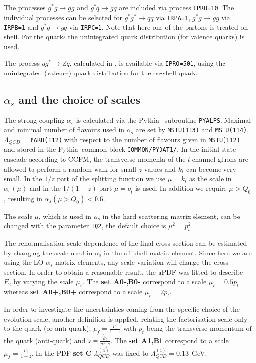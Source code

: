\documentclass[11pt]{article} \usepackage{mystyle-new}
\newcommand{\pt}{p_{t}}
\newcommand{\PYTHIAMC}{Pythia61}
\def\PYTHIA{{\sc Pythia}}
\begin{document}
 The processes $g^*g \to g g$ and $g^*q \to gq$ \cite{deak} are included via process 
\verb+IPRO=10+. The individual processes can be selected for $g^*g^* \to q\bar{q}$  via
\verb+IRPA=1+, $g^*g \to gg$  via \verb+IRPB=1+ and $g^* q \to gq$  via \verb+IRPC=1+. Note that here one of the partons is treated on-shell. For the quarks the unintegrated quark distribution (for valence quarks) is used.

The process $qg^* \to Z q$, calculated in \cite{Marzani:2008uh,Baranov:2008hj}, is available via \verb"IPRO=501", using the unintegrated (valence) quark distribution for the on-shell quark.

\subsection{$\alpha_s$ and the choice of scales}
The strong coupling $\alpha_s$ is calculated via the \PYTHIA~\cite{\PYTHIAMC} 
subroutine \verb+PYALPS+. 
Maximal and minimal number of flavours used in $\alpha_s$ are set by
\verb+MSTU(113)+ and \verb+MSTU(114)+, $\Lambda_{QCD}$ = \verb+PARU(112)+ with respect to the number of flavours given in
\verb+MSTU(112)+ and stored in the \PYTHIA\ common block
\verb+COMMON/PYDAT1/+.
In the initial state cascade according to CCFM, the transverse momenta of the
$t$-channel gluons are allowed to perform a random walk for small $z$ values 
and $k_t$ can become very small. 
In the $1/z$ part of the splitting function we use $\mu=k_t$ as the scale in 
$\alpha_s(\mu)$ and in the $1/(1-z)$ part  $\mu=p_t$ is used. In
addition we require $\mu > Q_0$, resulting in 
$\alpha_s(\mu>Q_0) < 0.6$.
\par
The scale $\mu$, which is used in $\alpha_s$
in the hard scattering matrix element, can be changed
with the parameter \verb+IQ2+, the default choice is $\mu^2 = p_t^2$.
\par
The renormalisation scale dependence of the final 
cross section can be estimated by changing the scale used in $\alpha_s$ in the
off-shell matrix element. Since here we are using the LO $\alpha_s$ matrix
elements, any scale variation will change the cross section. In order to obtain
a reasonable result, the uPDF was fitted to describe $F_2$  by varying the scale
$\mu_r$. The {\bf set A0-,B0-} correspond to a scale $\mu_r = 0.5 \pt$ whereas
 {\bf set A0+,B0+}  correspond to a scale $\mu_r = 2 \pt$. 
\par
In order to investigate the uncertainties coming from the specific choice of the
evolution scale,  
another definition is applied, relating the factorisation scale only to the 
quark (or anti-quark):
$\mu_f  = \frac{\pt}{1-z}$
with $\pt$ being the transverse momentum of the quark (anti-quark) and 
$z = \frac{\tilde{k}_t}{y x_g s} $. The {\bf set A1,B1} 
correspond to a scale $\mu_f  = \frac{\pt}{1-z}$.
In the PDF {\bf set C} $\Lambda^{(4)}_{QCD}$ was fixed to
$\Lambda^{(4)}_{QCD}=0.13$~GeV.
\end{document}
